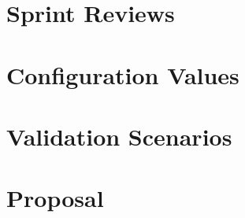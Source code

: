 \documentclass[12pt,a4paper,twoside,openright]{report}
\begin{document}
\newpage

\printbibliography


\appendix


\chapter{Sprint Reviews}



\newpage

\chapter{Configuration Values}



\newpage

\chapter{Validation Scenarios}



\newpage

\chapter{Proposal}



\end{document}
